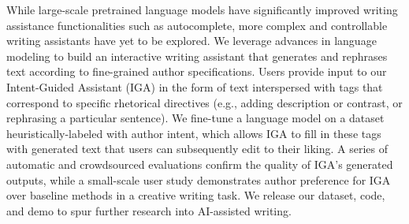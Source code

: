 While large-scale pretrained language models have significantly improved writing assistance functionalities such as autocomplete, more complex and controllable writing assistants have yet to be explored. We leverage advances in language modeling to build an interactive writing assistant that generates and rephrases text according to fine-grained author specifications. Users provide input to our Intent-Guided Assistant (IGA) in the form of text interspersed with tags that correspond to specific rhetorical directives (e.g., adding description or contrast, or rephrasing a particular sentence). We fine-tune a language model on a dataset heuristically-labeled with author intent, which allows IGA to fill in these tags with generated text that users can subsequently edit to their liking. A series of automatic and crowdsourced evaluations confirm the quality of IGA's generated outputs, while a small-scale user study demonstrates author preference for IGA over baseline methods in a creative writing task. We release our dataset, code, and demo to spur further research into AI-assisted writing.
